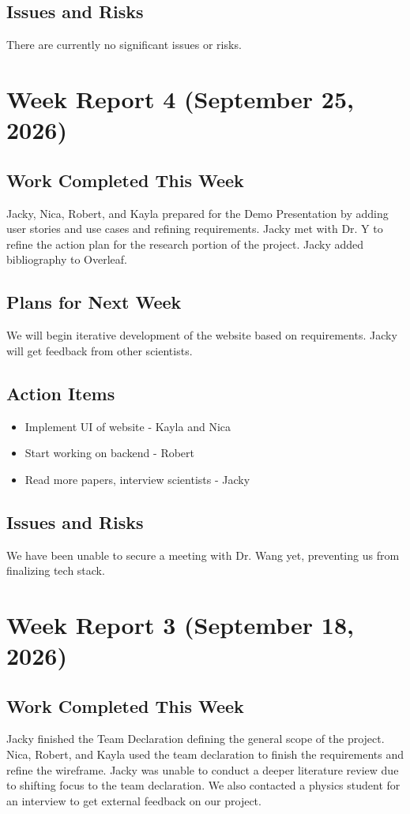 \subsection{Issues and Risks}
There are currently no significant issues or risks.

\section{Week Report 4 (September 25, 2026)}
\subsection{Work Completed This Week}
Jacky, Nica, Robert, and Kayla prepared for the Demo Presentation by adding user stories and use cases and refining requirements. Jacky met with Dr. Y to refine the action plan for the research portion of the project. Jacky added bibliography to Overleaf.

\subsection{Plans for Next Week}
We will begin iterative development of the website based on requirements. Jacky will get feedback from other scientists.

\subsection{Action Items}
\begin{itemize}
    \item Implement UI of website - Kayla and Nica
    \item Start working on backend - Robert
    \item Read more papers, interview scientists - Jacky
\end{itemize}

\subsection{Issues and Risks}
We have been unable to secure a meeting with Dr. Wang yet, preventing us from finalizing tech stack. 

\section{Week Report 3 (September 18, 2026)}
\subsection{Work Completed This Week}
Jacky finished the Team Declaration defining the general scope of the project. Nica, Robert, and Kayla used the team declaration to finish the requirements and refine the wireframe. Jacky was unable to conduct a deeper literature review due to shifting focus to the team declaration. We also contacted a physics student for an interview to get external feedback on our project. 

